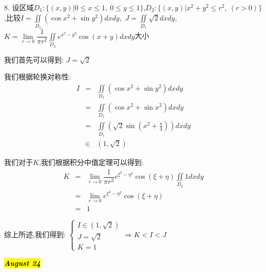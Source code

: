 8. 设区域$D_{1}:\{(x,y)| 0\leq x\leq 1,\ 0\leq y\leq 1\}$,$D_{2}:\{(x,y)| x^2+y^2\leq r^2,\ (r>0)\}$,比较$I=\iint \limits_{D_{1}}\left(\cos x^2+\sin y^2\right) dxdy$,\ $J=\iint\limits_{D_{1}}\sqrt{2}dxdy$,\ $K=\lim\limits_{r\rightarrow 0}\dfrac{1}{\pi r^2}\iint\limits_{D_{2}}e^{x^2-y^2}\cos(x+y)dxdy$大小
\begin{solution}

	我们首先可以得到:  $J=\sqrt{2}$
	
	我们根据轮换对称性:  
	\begin{eqnarray*}
		I&=&\iint \limits_{D_{1}}\left(\cos x^2+\sin y^2\right) dxdy\\
		&=&\iint \limits_{D_{1}}\left(\cos x^2+\sin x^2\right) dxdy\\
		&=&\iint \limits_{D_{1}}\left(\sqrt{2}\sin(x^2+\frac{\pi}{4})\right)dxdy\\
		&\in&(1,\sqrt{2})
	\end{eqnarray*}

	我们对于$K$,我们根据积分中值定理可以得到:  
	\begin{eqnarray*}
		K&=&\lim\limits_{r\rightarrow 0}\dfrac{1}{\pi r^2}e^{\xi^2-\eta^2}\cos(\xi+\eta)\iint\limits_{D_{2}}1dxdy\\
		&=&\lim\limits_{r\rightarrow 0}e^{\xi^2-\eta^2}\cos(\xi+\eta)\\
		&=&1
	\end{eqnarray*}

	综上所述,我们得到:  $\left\lbrace
	\begin{array}{l}
		I\in(1,\sqrt{2})\\
		J=\sqrt{2}\\
		K=1
	\end{array}
	\right.\Rightarrow K<I<J$
\end{solution}

\hl{\textbf{\textit{August 24}}}

